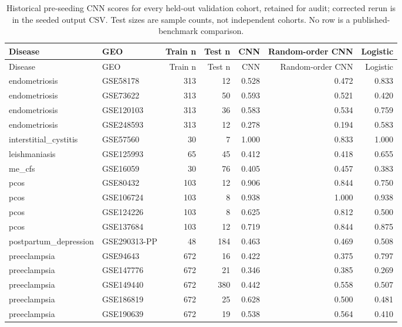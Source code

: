 \begin{longtable}{llrrrrr}
\caption{Historical pre-seeding CNN scores for every held-out validation cohort, retained for audit; corrected rerun is in the seeded output CSV. Test sizes are sample counts, not independent cohorts. No row is a published-benchmark comparison.}\label{tab:cnn}\\
\hline Disease & GEO & Train n & Test n & CNN & Random-order CNN & Logistic\\\hline\endfirsthead
\hline Disease & GEO & Train n & Test n & CNN & Random-order CNN & Logistic\\\hline\endhead
endometriosis & GSE58178 & 313 & 12 & 0.528 & 0.472 & 0.833\\
endometriosis & GSE73622 & 313 & 50 & 0.593 & 0.521 & 0.420\\
endometriosis & GSE120103 & 313 & 36 & 0.583 & 0.534 & 0.759\\
endometriosis & GSE248593 & 313 & 12 & 0.278 & 0.194 & 0.583\\
interstitial\_cystitis & GSE57560 & 30 & 7 & 1.000 & 0.833 & 1.000\\
leishmaniasis & GSE125993 & 65 & 45 & 0.412 & 0.418 & 0.655\\
me\_cfs & GSE16059 & 30 & 76 & 0.405 & 0.457 & 0.383\\
pcos & GSE80432 & 103 & 12 & 0.906 & 0.844 & 0.750\\
pcos & GSE106724 & 103 & 8 & 0.938 & 1.000 & 0.938\\
pcos & GSE124226 & 103 & 8 & 0.625 & 0.812 & 0.500\\
pcos & GSE137684 & 103 & 12 & 0.719 & 0.844 & 0.875\\
postpartum\_depression & GSE290313-PP & 48 & 184 & 0.463 & 0.469 & 0.508\\
preeclampsia & GSE94643 & 672 & 16 & 0.422 & 0.375 & 0.797\\
preeclampsia & GSE147776 & 672 & 21 & 0.346 & 0.385 & 0.269\\
preeclampsia & GSE149440 & 672 & 380 & 0.442 & 0.558 & 0.507\\
preeclampsia & GSE186819 & 672 & 25 & 0.628 & 0.500 & 0.481\\
preeclampsia & GSE190639 & 672 & 19 & 0.538 & 0.564 & 0.410\\
\hline\end{longtable}
